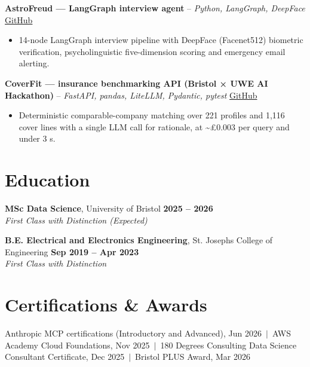 \documentclass[a4paper,11pt]{article}
\begin{document}
\vspace{3pt}
\noindent\textbf{AstroFreud — LangGraph interview agent} -- \textit{Python, LangGraph, DeepFace} \hfill \href{https://github.com/Thiruvel-AP/AstroFreud}{GitHub}
\begin{itemize}
  \item 14-node LangGraph interview pipeline with DeepFace (Facenet512) biometric verification, psycholinguistic five-dimension scoring and emergency email alerting.
\end{itemize}
\vspace{3pt}
\noindent\textbf{CoverFit — insurance benchmarking API (Bristol × UWE AI Hackathon)} -- \textit{FastAPI, pandas, LiteLLM, Pydantic, pytest} \hfill \href{https://github.com/Thiruvel-AP/AIHackathon-Phoenix}{GitHub}
\begin{itemize}
  \item Deterministic comparable-company matching over 221 profiles and 1,116 cover lines with a single LLM call for rationale, at \textasciitilde{}£0.003 per query and under 3 s.
\end{itemize}

\section{Education}
\textbf{MSc Data Science}, University of Bristol \hfill \textbf{2025 – 2026}\\ \textit{First Class with Distinction (Expected)}\par
\vspace{3pt}
\textbf{B.E. Electrical and Electronics Engineering}, St. Joseph\textquotesingle{}s College of Engineering \hfill \textbf{Sep 2019 – Apr 2023}\\ \textit{First Class with Distinction}\par

\section{Certifications \& Awards}
Anthropic MCP certifications (Introductory and Advanced), Jun 2026 \,$|$\, AWS Academy Cloud Foundations, Nov 2025 \,$|$\, 180 Degrees Consulting Data Science Consultant Certificate, Dec 2025 \,$|$\, Bristol PLUS Award, Mar 2026
\end{document}
